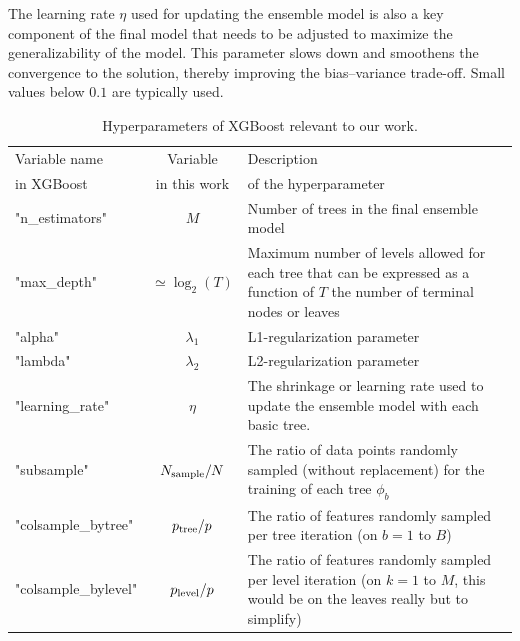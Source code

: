 \documentclass[main]{subfiles}
\begin{document}
The learning rate $\eta$ used for updating the ensemble model is also a key component of the final model that needs to be adjusted to maximize the generalizability of the model. This parameter slows down and smoothens the convergence to the solution, thereby improving the bias--variance trade-off. Small values below $0.1$ are typically used.

\begin{table}[ht]
  \setlength{\extrarowheight}{1pt}
  \centering
  \begin{tabular}{|l|c|m{8.5cm}|}
  \hline
    Variable name  &  Variable   &   Description\\
    in XGBoost  &    in this work &  of the hyperparameter \\
  \hline
      "n\_estimators" &   $M$ &   Number of trees in the final ensemble model  \\
      "max\_depth" &      $\simeq\log_2(T)$ &   Maximum number of levels allowed for each tree that can be expressed as a function of $T$ the number of terminal nodes or leaves \\
      "alpha" &   $\lambda_1$ &   L1-regularization parameter  \\
      "lambda" &   $\lambda_2$ &  L2-regularization parameter  \\
      "learning\_rate" &   $\eta$ &   The shrinkage or learning rate used to update the ensemble model with each basic tree.  \\
      "subsample" &   $N_{\text{sample}}/N$ &   The ratio of data points randomly sampled (without replacement) for the training of each tree $\phi_b$  \\
      "colsample\_bytree" &   $p_{\text{tree}}/p$  &   The ratio of features randomly sampled per tree iteration (on $b=1$ to $B$)  \\
      "colsample\_bylevel" &   $p_{\text{level}}/p$  &   The ratio of features randomly sampled per level iteration (on $k=1$ to $M$, this would be on the leaves really but to simplify) \\
  \hline
  \end{tabular}
  \caption{Hyperparameters of XGBoost relevant to our work.}\label{tab:hyperparameter}
\end{table}
\end{document}
